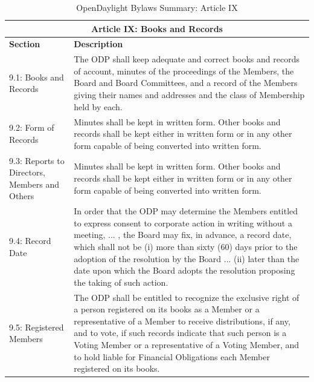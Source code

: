 \documentclass[a4paper, 12pt]{book}
\begin{document}
\begin{table}[H]
  \begin{center}
    \begin{tabular}{ | p{4cm} | p{11cm} | }
    \toprule
    \multicolumn {2}{|c|}{\textbf{Article IX: Books and Records}} \\
    \hline
    \textbf{Section} & \textbf{Description} \\
    \hline
    9.1: Books and Records & The ODP shall keep adequate and correct books and records of account, minutes of the proceedings of the Members, the Board and Board Committees, and a record of the Members giving their names and addresses and the class of Membership held by each.\\
    \hline
    9.2: Form of Records & Minutes shall be kept in written form.  Other books and records shall be kept either in written form or in any other form capable of being converted into written form.\\
    \hline
    9.3: Reports to Directors, Members and Others & Minutes shall be kept in written form.  Other books and records shall be kept either in written form or in any other form capable of being converted into written form.\\
    \hline
    9.4: Record Date & In order that the ODP may determine the Members entitled to express consent to corporate action in writing without a meeting, ... , the Board may fix, in advance, a record date, which shall not be (i) more than sixty (60) days prior to the adoption of the resolution by the Board ... (ii) later than the date upon which the Board adopts the resolution proposing the taking of such action.\\
    \hline
    9.5: Registered Members & The ODP shall be entitled to recognize the exclusive right of a person registered on its books as a Member or a representative of a Member to receive distributions, if any, and to vote, if such records indicate that such person is a Voting Member or a representative of a Voting Member, and to hold liable for Financial Obligations each Member registered on its books.\\
    \bottomrule
    \end{tabular}
    \caption{OpenDaylight Bylaws Summary: Article IX}
    \label{tab:odlbylaws-art09}
  \end{center}
\end{table}
\end{document}
